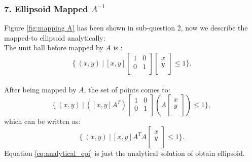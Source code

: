 \subsubsection*{7. Ellipsoid Mapped $A^{-1}$}
Figure \ref{fig:mapping A} has been shown in sub-question 2,
now we describe the mapped-to ellipsoid analytically:
\\
The unit ball before mapped by $A$ is :
\begin{equation*}
    \{\ (x,y) \ |\ [x,y]     
                    \begin{bmatrix}
                        1 & 0\\
                        0 & 1\\
                    \end{bmatrix}
                    \begin{bmatrix}
                        x\\
                        y\\
                    \end{bmatrix}   \leq 1  
    \}.
\end{equation*}
\\
After being mapped by $A$, the set of points comes to:
\begin{equation*}
    \{\ (x,y) \ |\ ([x,y]A^T)
                    \begin{bmatrix}
                        1 & 0\\
                        0 & 1\\
                    \end{bmatrix}
                    (A
                    \begin{bmatrix}
                        x\\
                        y\\
                    \end{bmatrix})  \leq 1  
    \},
\end{equation*}
which can be written as:
\begin{equation}
    \label{eq:analytical_epi}
    \{\ (x,y) \ |\ [x,y]A^TA
                    \begin{bmatrix}
                        x\\
                        y\\
                    \end{bmatrix}  \leq 1  
    \}.
\end{equation}
Equation \eqref{eq:analytical_epi} is just the analytical solution
of obtain ellipsoid.
